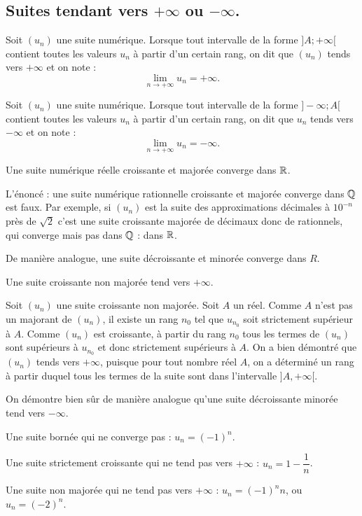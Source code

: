 \documentclass[a4paper,11pt,DIV20,BCOR0mm]{scrartcl}
\begin{document}
\subsection{Suites tendant vers $+\infty$ ou $-\infty$.}
\begin{definition}
 Soit $(u_n)$ une suite numérique. Lorsque tout intervalle de la forme $]A;+\infty[$
 contient toutes les valeurs $u_n$ à partir d'un certain rang, on dit que $(u_n)$ tends vers $+\infty$ et on note :
\[
 \lim_{n\to+\infty}u_n=+\infty.
\]
\end{definition}

\begin{definition}
 Soit $(u_n)$ une suite numérique. Lorsque tout intervalle de la forme $]-\infty;A[$
 contient toutes les valeurs $u_n$ à partir d'un certain rang, on dit que $u_n$ tends vers $-\infty$ et on note :
\[
 \lim_{n\to+\infty}u_n=-\infty.
\]
\end{definition}

\begin{theoreme}
Une suite numérique réelle croissante et majorée converge dans $\mathbb{R}$.
\end{theoreme}
\begin{remarque}
 L'énoncé : \og une suite numérique rationnelle croissante et majorée converge dans $\mathbb{Q}$\fg{} est
faux. Par exemple, si $(u_n)$ est la suite des approximations décimales à $10^{-n}$ près de
$\sqrt{2}$ c'est une suite croissante majorée de décimaux donc de rationnels, qui converge mais pas
dans $\mathbb{Q}$ : dans $\mathbb{R}$.
\end{remarque}

De manière analogue, une suite décroissante et minorée converge dans $R$.
\begin{theoreme}
 Une suite croissante non majorée tend vers $+\infty$.
\end{theoreme}
\begin{demonstration}[à connaître]
 Soit $(u_n)$ une suite croissante non majorée. Soit $A$ un réel. Comme $A$ n'est pas un majorant
de $(u_n)$, il existe un rang $n_0$ tel que $u_{n_0}$ soit strictement supérieur à $A$. 
Comme $(u_n)$ est croissante, à partir du rang $n_0$ tous les termes de
$(u_n)$ sont supérieurs à $u_{n_0}$ et donc strictement supérieurs à $A$. On a bien démontré que $(u_n)$ tends vers 
$+\infty$, puisque pour tout nombre réel $A$, on a déterminé un rang à partir duquel tous les termes de
la suite sont dans l'intervalle $]A,+\infty[$.
\end{demonstration}
On démontre bien sûr de manière analogue qu'une suite décroissante minorée tend vers $-\infty$.
\begin{exemple}
 Une suite bornée qui ne converge pas : $u_n=(-1)^n$.
\end{exemple}
\begin{exemple}
 Une suite strictement croissante qui ne tend pas vers $+\infty$ : $u_n=1-\dfrac1n$.
\end{exemple}
\begin{exemple}
 Une suite non majorée qui ne tend pas vers $+\infty$ : $u_n=(-1)^nn$, ou $u_n=(-2)^n$.
\end{exemple}
\end{document}
